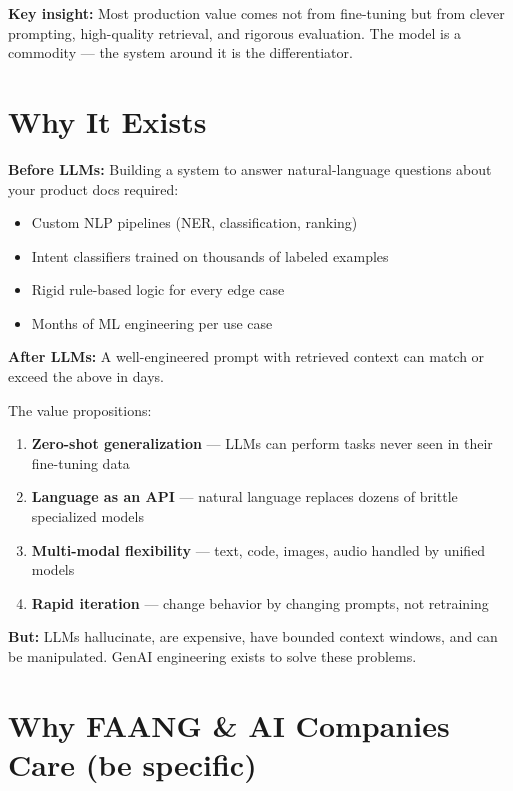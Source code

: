 \documentclass[11pt]{article}
\providecommand{\tightlist}{\setlength{\itemsep}{1pt}\setlength{\parskip}{0pt}}
\begin{document}
\textbf{Key insight:} Most production value comes not from fine-tuning but from clever prompting, high-quality retrieval, and rigorous evaluation. The model is a commodity --- the system around it is the differentiator.

\section{Why It Exists}\label{why-it-exists}

\textbf{Before LLMs:} Building a system to answer natural-language questions about your product docs required:

\begin{itemize}
\tightlist
\item
  Custom NLP pipelines (NER, classification, ranking)
\item
  Intent classifiers trained on thousands of labeled examples
\item
  Rigid rule-based logic for every edge case
\item
  Months of ML engineering per use case
\end{itemize}

\textbf{After LLMs:} A well-engineered prompt with retrieved context can match or exceed the above in days.

The value propositions:

\begin{enumerate}
\def\labelenumi{\arabic{enumi}.}
\tightlist
\item
  \textbf{Zero-shot generalization} --- LLMs can perform tasks never seen in their fine-tuning data
\item
  \textbf{Language as an API} --- natural language replaces dozens of brittle specialized models
\item
  \textbf{Multi-modal flexibility} --- text, code, images, audio handled by unified models
\item
  \textbf{Rapid iteration} --- change behavior by changing prompts, not retraining
\end{enumerate}

\textbf{But:} LLMs hallucinate, are expensive, have bounded context windows, and can be manipulated. GenAI engineering exists to solve these problems.

\section{Why FAANG \& AI Companies Care (be specific)}\label{why-faang--ai-companies-care-be-specific}
\end{document}
